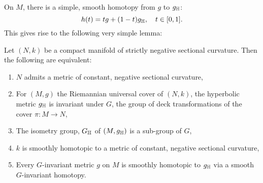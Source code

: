 \documentclass[a4paper, 12pt]{amsart}
\begin{document}
On \(M\), there is a simple, smooth homotopy from \(g\) to \(g_{\mathbb{H}}\):
\[
h(t) = tg + (1-t)g_{\mathbb{H}}, \quad t \in [0, 1].
\]
This gives rise to the following very simple lemma:

\begin{lemma}
\label{lem:const_neg}
Let \((N, k)\) be a compact manifold of strictly negative sectional curvature. Then the following are equivalent:
\begin{enumerate}[i]
\item \label{enum:neg_met} \(N\) admits a metric of constant, negative sectional curvature,
\item \label{enum:deck_met} For \((M, g)\) the Riemannian universal cover of \((N, k)\), the hyperbolic metric \(g_{\mathbb{H}}\) is invariant under \(G\), the group of deck transformations of the cover \(\pi : M \to N\),
\item \label{enum:subgroup} The isometry group, \(G_{\mathbb{H}}\) of \((M, g_{\mathbb{H}})\) is a sub-group of \(G\),
\item \label{enum:homo_met} \(k\) is smoothly homotopic to a metric of constant, negative sectional curvature,
\item \label{enum:homo_deck} Every \(G\)-invariant metric \(g\) on \(M\) is smoothly homotopic to \(g_{\mathbb{H}}\) via a smooth \(G\)-invariant homotopy.
\end{enumerate}
\end{lemma}
\end{document}
